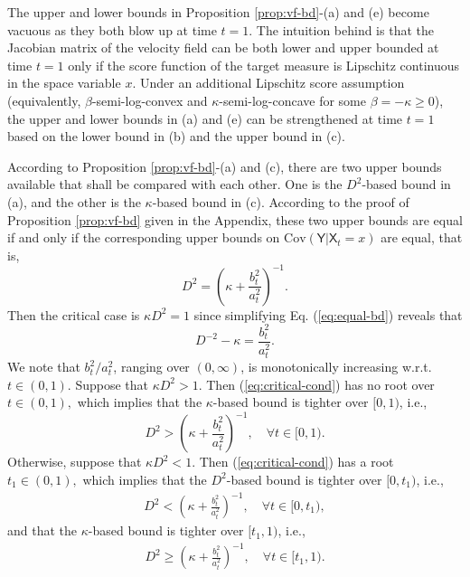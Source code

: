 \documentclass[twoside,11pt]{article}
\newcommand{\Cov}{\mathrm{Cov}}
\def\paref#1{(\ref{#1})}
\numberwithin{equation}{section}
\begin{document}
{\begin{remark} \label{rm:bd-blow-up}
The upper and lower bounds in Proposition \ref{prop:vf-bd}-(a) and (e) become vacuous as they both blow up at time $t = 1$.
The intuition behind is that the Jacobian matrix of the velocity field can be both lower and upper bounded at time $t = 1$ only if the score function of the target measure is Lipschitz continuous in the space variable $x$.
Under an additional Lipschitz score assumption (equivalently, $\beta$-semi-log-convex and $\kappa$-semi-log-concave for some $\beta = -\kappa \ge 0$), the upper and lower bounds in (a) and (e) can be strengthened at time $t = 1$
based on the lower bound in (b)
and the upper bound in (c).
\end{remark}

\begin{remark} \label{rm:bd-compare}
According to Proposition \ref{prop:vf-bd}-(a) and (c), there are two upper bounds available that shall be compared with each other. One is the $D^2$-based bound in (a), and the other is the $\kappa$-based bound in (c).
According to the proof of Proposition \ref{prop:vf-bd} given in the Appendix, these two upper bounds are equal if and only if the corresponding upper bounds on $\Cov (\mathsf{Y} | \mathsf{X}_t = x)$ are equal, that is,
\begin{equation}
    \label{eq:equal-bd}
    D^2 = \left( \kappa + \frac{b_t^2}{a_t^2} \right)^{-1}.
\end{equation}
Then the critical case is $\kappa D^2 = 1$ since simplifying Eq. \paref{eq:equal-bd} reveals that
\begin{equation}
    \label{eq:critical-cond}
    D^{-2} - \kappa = \frac{b_t^2}{a_t^2}.
\end{equation}
We note that $b_t^2 / a_t^2$, ranging over $(0, \infty)$, is monotonically increasing w.r.t. $t \in (0, 1)$.
Suppose that $\kappa D^2 > 1$. Then \paref{eq:critical-cond} has no root over
$t \in (0, 1), $ which
implies that the $\kappa$-based bound is tighter over $[0, 1)$, i.e.,
\begin{equation*}
    D^2 > \left( \kappa + \frac{b_t^2}{a_t^2} \right)^{-1}, \quad \forall t \in [0, 1).
\end{equation*}
Otherwise, suppose that $\kappa D^2 < 1$. Then \paref{eq:critical-cond} has a root
$t_1 \in (0, 1),$
which
implies that the $D^2$-based bound is tighter over $[0, t_1)$, i.e.,
\begin{align*}
    D^2 < \left( \kappa + \frac{b_t^2}{a_t^2} \right)^{-1}, \quad \forall t \in [0, t_1),
\end{align*}
and that the $\kappa$-based bound is tighter over $[t_1, 1)$, i.e.,
\begin{align*}
    D^2 \ge \left( \kappa + \frac{b_t^2}{a_t^2} \right)^{-1}, \quad \forall t \in [t_1, 1).
\end{align*}
\end{remark}
}
\fi
\end{document}
